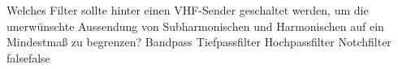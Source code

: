     {Welches Filter sollte hinter einen VHF-Sender geschaltet werden, um die unerwünschte Aussendung von Subharmonischen und Harmonischen auf ein Mindestmaß zu begrenzen? }
    {Bandpass}
    {Tiefpassfilter}
    {Hochpassfilter}
    {Notchfilter}
    {false}{false}